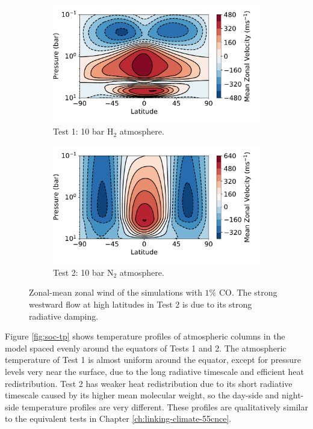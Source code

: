 \begin{figure}
  \centering
  \begin{subfigure}[t]{0.48\textwidth}
    \includegraphics[width=\textwidth]{figures/soc-lava-planets/h2-soc-zonal-u.pdf}
    \caption{Test 1: 10 bar H$_{2}$ atmosphere.}\label{fig:soc-zonal-u-h2}
  \end{subfigure}
\quad
  \begin{subfigure}[t]{0.48\textwidth}
    \includegraphics[width=\textwidth]{figures/soc-lava-planets/n2-soc-zonal-u.pdf}
    \caption{Test 2: 10 bar N$_{2}$ atmosphere.}\label{fig:soc-zonal-u-n2}
  \end{subfigure}
  \caption{Zonal-mean zonal wind of the simulations with $1\%$ CO. The strong westward flow at high latitudes in Test 2 is due to its strong radiative damping.}
  \label{fig:soc-zonal-u}
\end{figure}

Figure \ref{fig:soc-tp} shows temperature profiles of atmospheric columns in the model spaced evenly around the equators of Tests 1 and 2. The atmospheric temperature of Test 1 is almost uniform around the equator, except for pressure levels very near the surface, due to the long radiative timescale and efficient heat redistribution. Test 2 has weaker heat redistribution due to its short radiative timescale caused by its higher mean molecular weight, so the day-side and night-side temperature profiles are very different. These profiles are qualitatively similar to the equivalent tests in Chapter \ref{ch:linking-climate-55cnce}.

